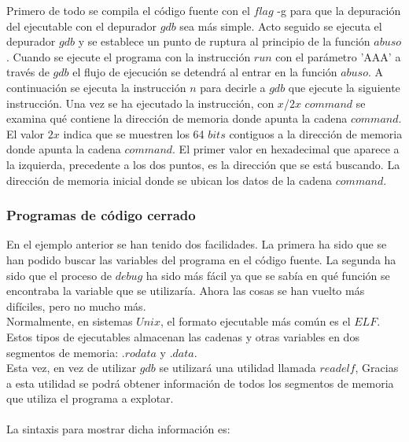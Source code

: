 \documentclass [titlepage, 12pt]{article}
\begin{document}
Primero de todo se compila el c\'odigo fuente con el $flag$ -g para que la depuraci\'on del ejecutable con el depurador $gdb$ sea m\'as simple. Acto seguido se ejecuta el depurador $gdb$ y se establece un punto de ruptura al principio de la funci\'on $abuso$. Cuando se ejecute el programa con la instrucci\'on $run$ con el par\'ametro 'AAA' a trav\'es de $gdb$ el flujo de ejecuci\'on se detendr\'a al entrar en la funci\'on $abuso$. A continuaci\'on se ejecuta la instrucci\'on $n$ para decirle a $gdb$ que ejecute la siguiente instrucci\'on. Una vez se ha ejecutado la instrucci\'on, con $x$/$2x$ $command$ se examina qu\'e contiene la direcci\'on de memoria donde apunta la cadena $command$. El valor $2x$ indica que se muestren los 64 $bits$ contiguos a la direcci\'on de memoria donde apunta la cadena $command$. El primer valor en hexadecimal que aparece a la izquierda, precedente a los dos puntos, es la direcci\'on que se est\'a buscando. La direcci\'on de memoria inicial donde se ubican los datos de la cadena $command$.

\subsubsection{Programas de c\'odigo cerrado}

En el ejemplo anterior se han tenido dos facilidades. La primera ha sido que se han podido buscar las variables del programa en el c\'odigo fuente. La segunda ha sido que el proceso de $debug$ ha sido m\'as f\'acil ya que se sab\'ia en qu\'e funci\'on se encontraba la variable que se utilizar\'ia. Ahora las cosas se han vuelto m\'as dif\'iciles, pero no mucho m\'as.\\
Normalmente, en sistemas $Unix$, el formato ejecutable m\'as com\'un es el $ELF$. Estos tipos de ejecutables almacenan las cadenas y otras variables en dos segmentos de memoria: $.rodata$ y $.data$.\\
Esta vez, en vez de utilizar $gdb$ se utilizar\'a una utilidad llamada $readelf$, Gracias a esta utilidad se podr\'a obtener informaci\'on de todos los segmentos de memoria que utiliza el programa a explotar.\\
\\
La sintaxis para mostrar dicha informaci\'on es:
\end{document}
